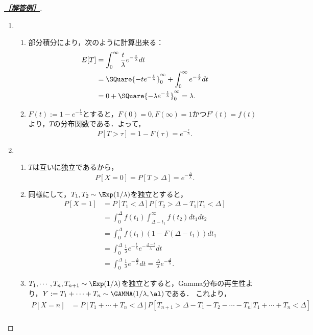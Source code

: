 \documentclass[uplatex,dvipdfmx]{jsarticle}
\begin{document}
\begin{proof}[\textbf{\underline{［解答例］}}]\mbox{}
    \begin{enumerate}
        \item \begin{enumerate}
            \item 部分積分により，次のように計算出来る：
            \begin{align*}
                E[T]&=\int^\infty_0\frac{t}{\lambda}e^{-\frac{t}{\lambda}}dt\\
                &=\SQuare{-te^{-\frac{t}{\lambda}}}^\infty_0+\int^\infty_0e^{-\frac{t}{\lambda}}dt\\
                &=0+\SQuare{-\lambda e^{-\frac{t}{\lambda}}}^\infty_0=\lambda.
            \end{align*}
            \item $F(t):=1-e^{-\frac{t}{\lambda}}$とすると，$F(0)=0,F(\infty)=1$かつ$F'(t)=f(t)$より，$T$の分布関数である．よって，
            \[P[T>\tau]=1-F(\tau)=e^{-\frac{\tau}{\lambda}}.\]
        \end{enumerate}
        \item \begin{enumerate}
            \item $T$は互いに独立であるから，
            \[P[X=0]=P[T>\Delta]=e^{-\frac{\Delta}{\lambda}}.\]
            \item 同様にして，$T_1,T_2\sim\Exp(1/\lambda)$を独立とすると，
            \begin{align*}
                P[X=1]&=P[T_1<\Delta]P[T_2>\Delta-T_1|T_1<\Delta]\\
                &=\int^\Delta_0f(t_1)\int^\infty_{\Delta-t_1}f(t_2)dt_1dt_2\\
                &=\int^\Delta_0f(t_1)(1-F(\Delta-t_1))dt_1\\
                &=\int^\Delta_0\frac{1}{\lambda}e^{-\frac{t}{\lambda}}e^{-\frac{\Delta-t}{\lambda}}dt\\
                &=\int^\Delta_0\frac{1}{\lambda}e^{-\frac{\Delta}{\lambda}}dt=\frac{\Delta}{\lambda}e^{-\frac{\Delta}{\lambda}}.
            \end{align*}
            \item $T_1,\cdots,T_n,T_{n+1}\sim\Exp(1/\lambda)$を独立とすると，Gamma分布の再生性より，$Y:=T_1+\cdots+T_n\sim\GAMMA(1/\lambda,\al)$である．
            これより，
            \begin{align*}
                P[X=n]&=P[T_1+\cdots+T_n<\Delta]P[T_{n+1}>\Delta-T_1-T_2-\cdots-T_n|T_1+\cdots+T_n<\Delta]\\

\end{align*}
\end{enumerate}
\end{enumerate}
\end{proof}
\end{document}
